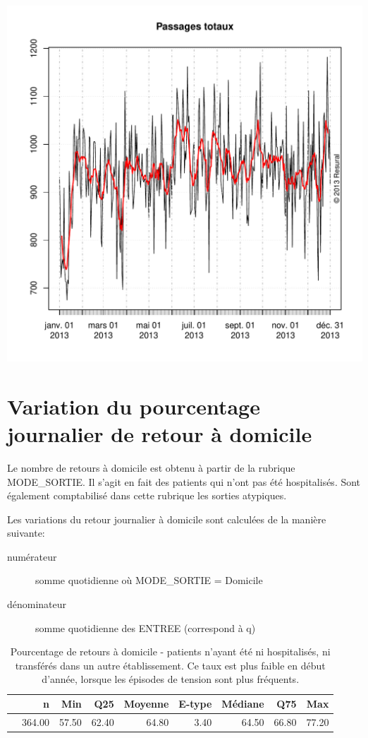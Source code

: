 \documentclass[12pt,english,french,twoside]{book}\usepackage[]{graphicx}\usepackage[]{color}
\makeatletter
\def\maxwidth{ %
  \ifdim\Gin@nat@width>\linewidth
    \linewidth
  \else
    \Gin@nat@width
  \fi
}
\makeatother
\begin{document}
\includegraphics[width=\maxwidth]{figure/passages_totaux3} 




\section{Variation du pourcentage journalier de retour à domicile}

Le nombre de retours à domicile est obtenu à partir de la rubrique MODE\_SORTIE. Il s'agit en fait des patients qui n'ont pas été hospitalisés. Sont également comptabilisé dans cette rubrique les sorties atypiques.

Les variations du retour journalier à domicile sont calculées de la manière suivante:
\begin{description}
  \item[numérateur] somme quotidienne où MODE\_SORTIE = Domicile
  \item[dénominateur] somme quotidienne des ENTREE (correspond à q)
\end{description}

\begin{table}[ht]
\centering
\begin{tabular}{rrrrrrrrr}
  \hline
 & n & Min & Q25 & Moyenne & E-type & Médiane & Q75 & Max \\ 
  \hline
 & 364.00 & 57.50 & 62.40 & 64.80 & 3.40 & 64.50 & 66.80 & 77.20 \\ 
   \hline
\end{tabular}
\caption[Retour à domicile]{Pourcentage de retours à domicile - patients n'ayant été ni hospitalisés, ni transférés dans un autre établissement. Ce taux est plus faible en début d'année, lorsque les épisodes de tension sont plus fréquents.} 
\label{tab:rd}
\end{table}
\end{document}
